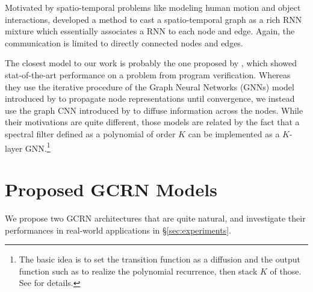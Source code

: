 \documentclass{article}
\newcommand{\secref}[1]{\S\ref{sec:#1}}
\begin{document}
Motivated by spatio-temporal problems like modeling human motion and object
interactions, \citet{structuralrnn} developed a method to cast a
spatio-temporal graph as a rich RNN mixture which essentially associates a RNN
to each node and edge. Again, the communication is limited to directly
connected nodes and edges.


The closest model to our work is probably the one proposed by \citet{ggsnn_li},
which showed stat-of-the-art performance on a problem from program
verification. Whereas they use the iterative procedure of the Graph Neural
Networks (GNNs) model introduced by \citet{gnn_scarcelli} to propagate node
representations until convergence, we instead use the graph CNN introduced by
\citet{gcnn} to diffuse information across the nodes. While their motivations
are quite different, those models are related by the fact that a spectral
filter defined as a polynomial of order $K$ can be implemented as a $K$-layer
GNN.\footnote{The basic idea is to set the transition function as a diffusion
and the output function such as to realize the polynomial recurrence, then
stack $K$ of those. See \citet{gcnn} for details.}

\section{Proposed GCRN Models}
\label{sec:our_models}


We propose two GCRN architectures that are quite natural, and investigate their
performances in real-world applications in \secref{experiments}.
\end{document}

